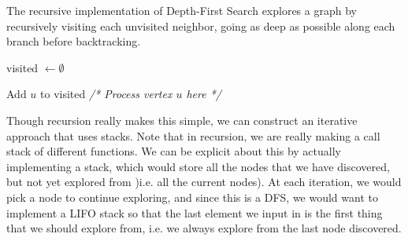   \begin{algo}
    The recursive implementation of Depth-First Search explores a graph by recursively visiting each unvisited neighbor, going as deep as possible along each branch before backtracking.
    \begin{algorithm}[H]
      \label{alg:dfs_recursive}
      \begin{algorithmic}[1]
        
          \State visited $\gets \emptyset$ 
          \State {}
        \EndFunction
        
          \State Add $u$ to visited
          \State \textit{/* Process vertex $u$ here */}
              \State {}
            \EndIf
          \EndFor
        \EndFunction
      \end{algorithmic}
    \end{algorithm}
  \end{algo}

  Though recursion really makes this simple, we can construct an iterative approach that uses stacks. Note that in recursion, we are really making a call stack of different functions. We can be explicit about this by actually implementing a stack, which would store all the nodes that we have discovered, but not yet explored from )i.e. all the current nodes). At each iteration, we would pick a node to continue exploring, and since this is a DFS, we would want to implement a LIFO stack so that the last element we input in is the first thing that we should explore from, i.e. we always explore from the last node discovered. 

